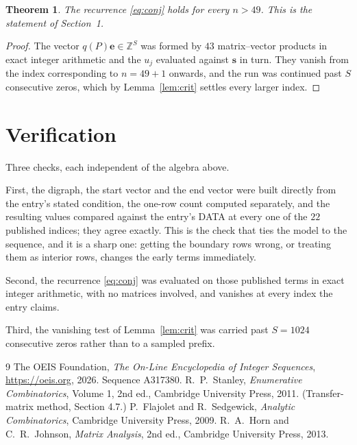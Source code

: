 \documentclass[11pt,a4paper]{article}
\theoremstyle{plain}
\newtheorem{theorem}{Theorem}
\theoremstyle{definition}
\begin{document}
\begin{theorem}
The recurrence \eqref{eq:conj} holds for every $n>49$. This is the statement of
Section~1.
\end{theorem}

\begin{proof}
The vector $q(P)\mathbf{e}\in\mathbb{Z}^{S}$ was formed by $43$ matrix--vector
products in exact integer arithmetic and the $u_j$ evaluated against $\mathbf{s}$ in turn.
They vanish from the index corresponding to $n=49+1$ onwards, and the run was continued
past $S$ consecutive zeros, which by Lemma~\ref{lem:crit} settles every larger index.
\end{proof}

\section{Verification}

Three checks, each independent of the algebra above.

First, the digraph, the start vector and the end vector were built directly from the
entry's stated condition, the one-row count computed separately, and the resulting values
compared against the entry's DATA at every one of the $22$ published indices; they
agree exactly. This is the check that ties the model to the sequence, and it is a sharp one:
getting the boundary rows wrong, or treating them as interior rows, changes the early terms
immediately.

Second, the recurrence \eqref{eq:conj} was evaluated on those published terms in exact
integer arithmetic, with no matrices involved, and vanishes at every index the entry claims.

Third, the vanishing test of Lemma~\ref{lem:crit} was carried past $S=1024$ consecutive
zeros rather than to a sampled prefix.

\begin{thebibliography}{9}
 The OEIS Foundation, \emph{The On-Line Encyclopedia of Integer
Sequences}, \url{https://oeis.org}, 2026. Sequence A317380.
 R.~P.~Stanley, \emph{Enumerative Combinatorics}, Volume 1, 2nd ed.,
Cambridge University Press, 2011. (Transfer-matrix method, Section 4.7.)
 P.~Flajolet and R.~Sedgewick, \emph{Analytic Combinatorics}, Cambridge
University Press, 2009.
 R.~A.~Horn and C.~R.~Johnson, \emph{Matrix Analysis}, 2nd ed., Cambridge
University Press, 2013.
\end{thebibliography}
\end{document}
